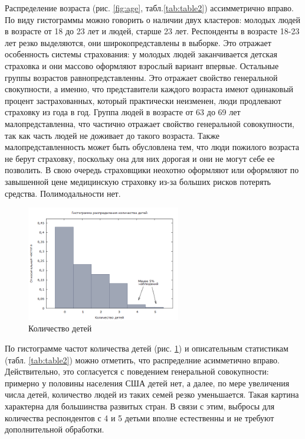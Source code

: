 \documentclass[a4paper,12pt]{article}
\begin{document}
Распределение возраста (рис. \ref{fig:age}, табл.\ref{tab:table2}) ассимметрично вправо. По виду гистограммы можно говорить о наличии двух кластеров: молодых людей в возрасте от 18 до 23 лет и людей, старше 23 лет. Респонденты в возрасте 18-23 лет резко выделяются, они широкопредставлены в выборке. Это отражает особенность системы страхования: у молодых людей заканчивается детская страховка и они массово оформляют взрослый вариант впервые. Остальные группы возрастов равнопредставленны. Это отражает свойство генеральной свокупности, а именно, что представители каждого возраста имеют одинаковый процент застрахованных, который практически неизменен, люди продлевают страховку из года в год. Группа людей в возрасте от 63 до 69 лет малопредставленна, что частично отражает свойство генеральной совокупности, так как часть людей не доживает до такого возраста. Также малопредставленность может быть обусловлена тем, что люди пожилого возраста не берут страховку, поскольку она для них дорогая и они не могут себе ее позволить. В свою очередь страховщики неохотно оформляют или оформляют по завышенной цене медицинскую страховку из-за больших рисков потерять средства. Полимодальности нет.

\begin{figure}[H]
	\includegraphics[width=0.6\textwidth]{../[graphics]/children.png}
	\centering
	\caption{Количество детей}
	\label{fig:children}
\end{figure}

По гистограмме частот количества детей (рис. \ref{fig:children}) и описательным статистикам (табл. \ref{tab:table2}) можно отметить, что распределние асимметично вправо. Действительно, это согласуется с поведением генеральной совокупности: примерно у половины населения США детей нет, а далее, по мере увеличения числа детей, количество людей из таких семей резко уменьшается. Такая картина характерна для большинства развитых стран. В связи с этим, выбросы для количества респондентов с 4 и 5 детьми вполне естественны и не требуют дополнительной обработки.
\end{document}
